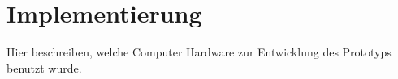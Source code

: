 \chapter{Implementierung}
Hier beschreiben, welche Computer Hardware zur Entwicklung des Prototyps benutzt wurde.